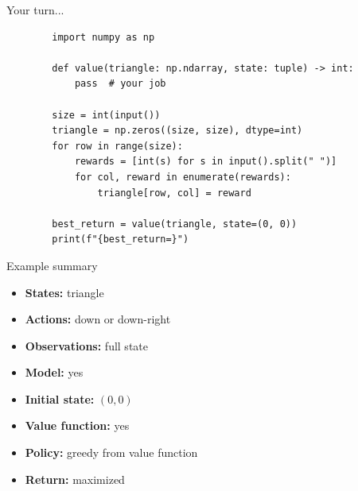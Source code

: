 \documentclass[11pt, aspectratio=169]{beamer}
\begin{document}
\begin{frame}[fragile]{Your turn...}
    \begin{verbatim}
        import numpy as np

        def value(triangle: np.ndarray, state: tuple) -> int:
            pass  # your job

        size = int(input())
        triangle = np.zeros((size, size), dtype=int)
        for row in range(size):
            rewards = [int(s) for s in input().split(" ")]
            for col, reward in enumerate(rewards):
                triangle[row, col] = reward

        best_return = value(triangle, state=(0, 0))
        print(f"{best_return=}")
    \end{verbatim}
\end{frame}

\begin{frame}{Example summary}
    \begin{itemize}
        \item \textbf{States:} triangle
        \item \textbf{Actions:} down or down-right
        \item \textbf{Observations:} full state
        \item \textbf{Model:} yes
        \item \textbf{Initial state:} $(0, 0)$
        \item \textbf{Value function:} yes
        \item \textbf{Policy:} greedy from value function
        \item \textbf{Return:} maximized
    \end{itemize}
\end{frame}
\end{document}
